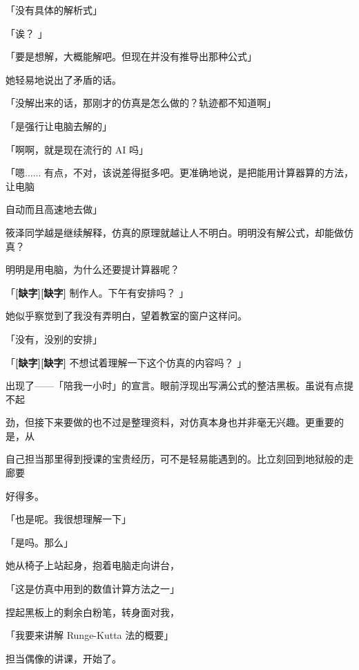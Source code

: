 「没有具体的解析式」\par
「诶？ 」\par
「要是想解，大概能解吧。但现在并没有推导出那种公式」\par
她轻易地说出了矛盾的话。\par
「没解出来的话，那刚才的仿真是怎么做的？轨迹都不知道啊」\par
「是强行让电脑去解的」\par
「啊啊，就是现在流行的 AI 吗」\par
「嗯...... 有点，不对，该说差得挺多吧。更准确地说，是把能用计算器算的方法，让电脑\par
自动而且高速地去做」\par
筱泽同学越是继续解释，仿真的原理就越让人不明白。明明没有解公式，却能做仿真？\par
明明是用电脑，为什么还要提计算器呢？\par
「\textbf{[缺字]}\textbf{[缺字]} 制作人。下午有安排吗？ 」\par
她似乎察觉到了我没有弄明白，望着教室的窗户这样问。\par
「没有，没别的安排」\par
「\textbf{[缺字]}\textbf{[缺字]} 不想试着理解一下这个仿真的内容吗？ 」\par
出现了——「陪我一小时」的宣言。眼前浮现出写满公式的整洁黑板。虽说有点提不起\par
劲，但接下来要做的也不过是整理资料，对仿真本身也并非毫无兴趣。更重要的是，从\par
自己担当那里得到授课的宝贵经历，可不是轻易能遇到的。比立刻回到地狱般的走廊要\par
好得多。\par
「也是呢。我很想理解一下」\par
「是吗。那么」\par
她从椅子上站起身，抱着电脑走向讲台，\par
「这是仿真中用到的数值计算方法之一」\par
捏起黑板上的剩余白粉笔，转身面对我，\par
「我要来讲解 Runge-Kutta 法的概要」\par
担当偶像的讲课，开始了。\par

